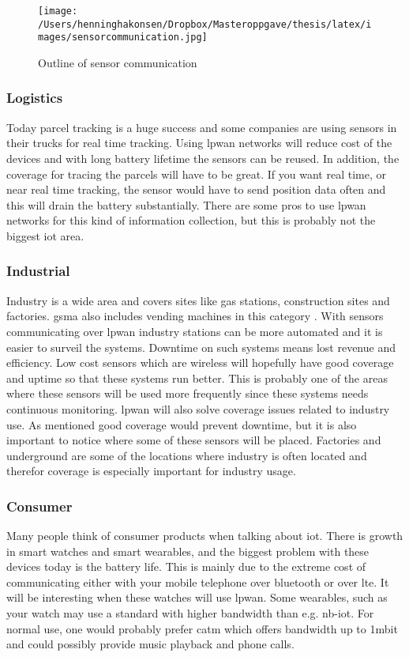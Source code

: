 \documentclass[USenglish]{ifimaster}  %
\begin{document}
\begin{figure}[H]
  \centering\texttt{[image: /Users/henninghakonsen/Dropbox/Masteroppgave/thesis/latex/images/sensorcommunication.jpg]}
  \caption[Outline of sensor communication from Q-Free]{Outline of sensor communication \cite{person:ola}}
  \label{pic:sensorcommunication}
\end{figure}

\subsubsection{Logistics}
Today parcel tracking is a huge success and some companies are using sensors in their trucks for real time tracking. Using \acrshort{lpwan} networks will reduce cost of the devices and with long battery lifetime the sensors can be reused. In addition, the coverage for tracing the parcels will have to be great. If you want real time, or near real time tracking, the sensor would have to send position data often and this will drain the battery substantially. There are some pros to use \acrshort{lpwan} networks for this kind of information collection, but this is probably not the biggest \acrshort{iot} area.

\subsubsection{Industrial}
Industry is a wide area and covers sites like gas stations, construction sites and factories. \acrshort{gsma} also includes vending machines in this category \cite{online:lpwaFuture}. With sensors communicating over \acrshort{lpwan} industry stations can be more automated and it is easier to surveil the systems. Downtime on such systems means lost revenue and efficiency. Low cost sensors which are wireless will hopefully have good coverage and uptime so that these systems run better. This is probably one of the areas where these sensors will be used more frequently since these systems needs continuous monitoring. \acrshort{lpwan} will also solve coverage issues related to industry use. As mentioned good coverage would prevent downtime, but it is also important to notice where some of these sensors will be placed. Factories and underground are some of the locations where industry is often located and therefor coverage is especially important for industry usage.

\subsubsection{Consumer}
Many people think of consumer products when talking about \acrshort{iot}. There is growth in smart watches and smart wearables, and the biggest problem with these devices today is the battery life. This is mainly due to the extreme cost of communicating either with your mobile telephone over bluetooth or over \acrshort{lte}. It will be interesting when these watches will use \acrshort{lpwan}. Some wearables, such as your watch may use a standard with higher bandwidth than e.g. \acrshort{nb-iot}. For normal use, one would probably prefer \acrshort{catm} which offers bandwidth up to 1\acrshort{mbit} and could possibly provide music playback and phone calls.
\end{document}
